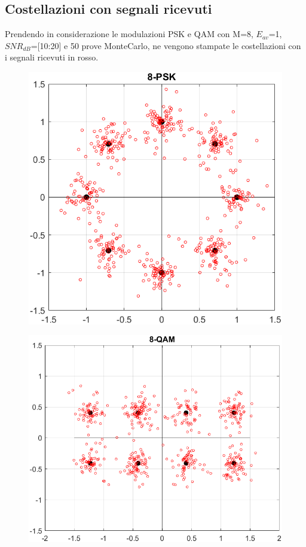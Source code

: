 \documentclass[12pt, a4paper]{article}
\begin{document}
	\subsection{Costellazioni con segnali ricevuti}
	Prendendo in considerazione le modulazioni PSK e QAM con M=8, \(E_{av}\)=1, \(SNR_{dB}\)=[10:20] e 50 prove MonteCarlo, ne vengono stampate le costellazioni con i segnali ricevuti in rosso. 
	\begin{figure}[ht]
		\begin{minipage}{0.4\linewidth} %
			\centering
			\includegraphics[width=\linewidth]{images/untitled2.png}
			\label{fig:8-PSK}
		\end{minipage}
		\hspace{3cm} %
		\begin{minipage}{0.4\linewidth}
			\centering
			\includegraphics[width=\linewidth]{images/untitled1.png}
			\label{fig:8-QAM}
		\end{minipage}
	\end{figure}
\end{document}

